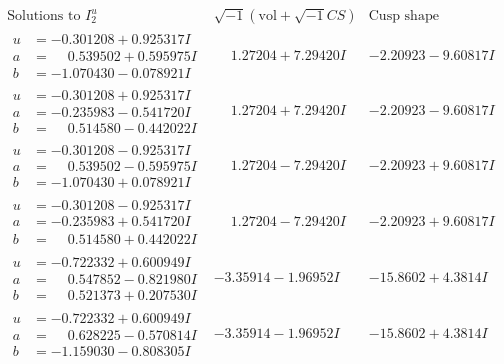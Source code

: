 \documentclass[1p]{elsarticle_modified}
\theoremstyle{definition}
\newcommand{\I}{\sqrt{-1}}
\begin{document}
$$\begin{array}{c|c|c}  
\text{Solutions to }I^u_{2}& \I (\text{vol} + \sqrt{-1}CS) & \text{Cusp shape}\\
 \hline 
\begin{aligned}
u &= -0.301208 + 0.925317 I \\
a &= \phantom{-}0.539502 + 0.595975 I \\
b &= -1.070430 - 0.078921 I\end{aligned}
 & \phantom{-}1.27204 + 7.29420 I & -2.20923 - 9.60817 I \\ \hline\begin{aligned}
u &= -0.301208 + 0.925317 I \\
a &= -0.235983 - 0.541720 I \\
b &= \phantom{-}0.514580 - 0.442022 I\end{aligned}
 & \phantom{-}1.27204 + 7.29420 I & -2.20923 - 9.60817 I \\ \hline\begin{aligned}
u &= -0.301208 - 0.925317 I \\
a &= \phantom{-}0.539502 - 0.595975 I \\
b &= -1.070430 + 0.078921 I\end{aligned}
 & \phantom{-}1.27204 - 7.29420 I & -2.20923 + 9.60817 I \\ \hline\begin{aligned}
u &= -0.301208 - 0.925317 I \\
a &= -0.235983 + 0.541720 I \\
b &= \phantom{-}0.514580 + 0.442022 I\end{aligned}
 & \phantom{-}1.27204 - 7.29420 I & -2.20923 + 9.60817 I \\ \hline\begin{aligned}
u &= -0.722332 + 0.600949 I \\
a &= \phantom{-}0.547852 - 0.821980 I \\
b &= \phantom{-}0.521373 + 0.207530 I\end{aligned}
 & -3.35914 - 1.96952 I & -15.8602 + 4.3814 I \\ \hline\begin{aligned}
u &= -0.722332 + 0.600949 I \\
a &= \phantom{-}0.628225 - 0.570814 I \\
b &= -1.159030 - 0.808305 I\end{aligned}
 & -3.35914 - 1.96952 I & -15.8602 + 4.3814 I \\ \hline\begin{aligned}

\end{aligned}
\end{array}$$
\end{document}
